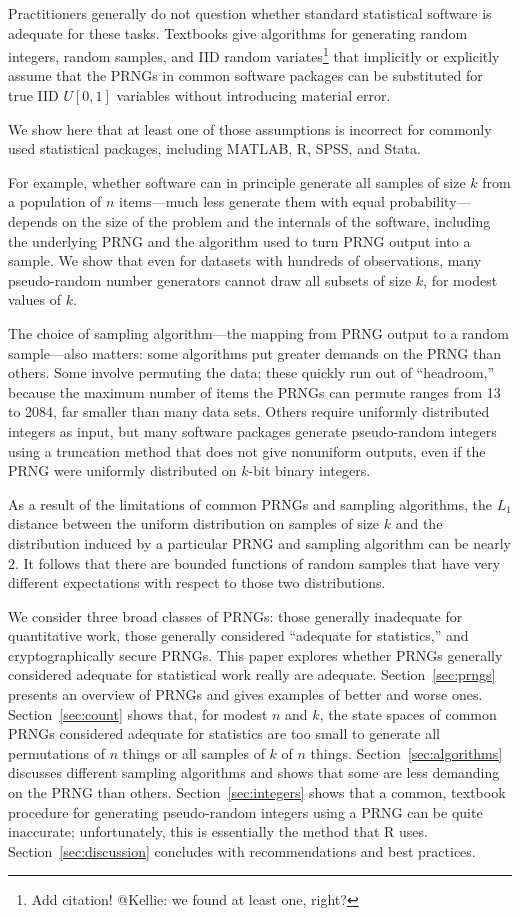 \documentclass[graybox]{svmult}
\begin{document}
Practitioners generally do not question whether standard statistical software is adequate for these tasks.
Textbooks give algorithms for generating random integers, random samples,
and IID random variates\footnote{%
Add citation! @Kellie: we found at least one, right?
} 
that implicitly or explicitly assume that the PRNGs in common software packages 
can be substituted for true IID $U[0,1]$ variables without introducing material error.

We show here that at least one of those assumptions is incorrect for commonly used statistical packages,
including MATLAB, R, SPSS, and Stata.

For example, whether software can in principle generate all samples of size $k$ from a population of
$n$ items---much less generate them with equal probability---depends on the size of the problem and the internals of the software, including the underlying PRNG and the
algorithm used to turn PRNG output into a sample.
We show that even for datasets with hundreds of observations, 
many pseudo-random number generators
cannot draw all subsets of size $k$, for modest values of $k$.

The choice of sampling algorithm---the mapping from PRNG output to a random sample---also matters:
some algorithms put greater demands on the PRNG than others.
Some involve permuting the data; these quickly run out of ``headroom,'' because the maximum number of items the PRNGs can permute ranges from 13 to 2084, far smaller than many data sets.
Others require uniformly distributed integers as input, but many software packages generate
pseudo-random integers using a truncation method that does not give nonuniform outputs, even
if the PRNG were uniformly distributed on $k$-bit binary integers.

As a result of the limitations of common PRNGs and sampling algorithms,
the $L_1$ distance between the uniform distribution on samples of
size $k$ and the distribution induced by a particular PRNG and sampling algorithm can be nearly $2$.
It follows that there are bounded functions of random samples that have very different expectations with respect to those two distributions.

We consider three broad classes of PRNGs: those generally inadequate for quantitative work, those generally considered ``adequate for statistics,'' and cryptographically secure
PRNGs.
This paper explores whether PRNGs generally considered adequate for statistical work really are
adequate.
Section~\ref{sec:prngs} presents an overview of PRNGs and gives examples of better and worse ones.
Section~\ref{sec:count} shows that, for modest $n$ and $k$, the state spaces of common PRNGs considered adequate for statistics are too small to generate all permutations of $n$ things or all samples of $k$ of $n$ things. 
Section~\ref{sec:algorithms} discusses different sampling algorithms and shows that some are less demanding on the PRNG than others. 
Section~\ref{sec:integers} shows that a common, textbook procedure for generating pseudo-random integers using a PRNG can be quite inaccurate; unfortunately, this is essentially the method that R uses.
Section~\ref{sec:discussion} concludes with recommendations and best practices.
\end{document}
